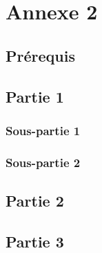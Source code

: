 \section*{Annexe 2}
\label{sec:annexe2}
\subsection*{Prérequis}
\label{ssec:annexe2_prerequis}
\subsection*{Partie 1}
\label{ssec:annexe2_partie1}
\subsubsection*{Sous-partie 1}
\label{sssec:annexe2_partie1_sous1}
\subsubsection*{Sous-partie 2}
\label{sssec:annexe2_partie1_sous2}
\subsection*{Partie 2}
\label{ssec:annexe2_partie2}
\subsection*{Partie 3}
\label{ssec:annexe2_partie3}
